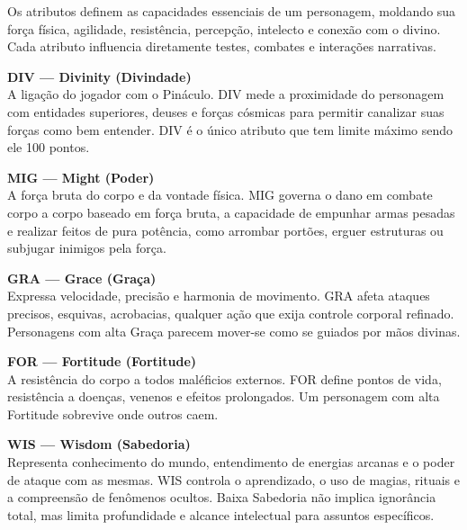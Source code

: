
Os atributos definem as capacidades essenciais de um personagem, moldando sua força física, agilidade, resistência, percepção, intelecto e conexão com o divino.  
Cada atributo influencia diretamente testes, combates e interações narrativas.

\noindent


\noindent
\hypertarget{target:divinity}{\textbf{\baskerfamily\large DIV — Divinity (Divindade)}}\\
A ligação do jogador com o Pináculo. DIV mede a proximidade do personagem com entidades superiores, deuses e 
forças cósmicas para permitir canalizar suas forças como bem entender. DIV é o único atributo que tem 
limite máximo sendo ele 100 pontos.



\noindent
\textbf{\baskerfamily\large MIG — Might (Poder)}\\
A força bruta do corpo e da vontade física. MIG governa o dano em combate corpo a corpo baseado em força bruta, 
a capacidade de empunhar armas pesadas e realizar feitos de pura potência, como arrombar portões, erguer estruturas ou 
subjugar inimigos pela força.


\noindent
\textbf{\baskerfamily\large GRA — Grace (Graça)}\\
Expressa velocidade, precisão e harmonia de movimento. GRA afeta ataques precisos, esquivas, acrobacias, 
qualquer ação que exija controle corporal refinado. Personagens com alta Graça parecem mover-se como se guiados por mãos divinas.

\noindent
\textbf{\baskerfamily\large FOR — Fortitude (Fortitude)}\\
A resistência do corpo a todos maléficios externos. FOR define pontos de vida, resistência a doenças, 
venenos e efeitos prolongados. Um personagem com alta Fortitude sobrevive onde outros caem.

\noindent
\textbf{\baskerfamily\large WIS — Wisdom (Sabedoria)}\\
Representa conhecimento do mundo, entendimento de energias arcanas e o poder de ataque com as mesmas. 
WIS controla o aprendizado, o uso de magias, rituais e a compreensão de fenômenos ocultos. 
Baixa Sabedoria não implica ignorância total, mas limita profundidade e alcance intelectual para assuntos específicos.

